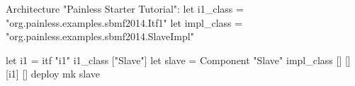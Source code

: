 Architecture "Painless Starter Tutorial":
let i1_class = "org.painless.examples.sbmf2014.Itf1" 
let impl_class = "org.painless.examples.sbmf2014.SlaveImpl"  

let i1 = itf "i1" i1_class ["Slave"] 
let slave = Component "Slave" impl_class [] [] [i1] []
deploy mk slave